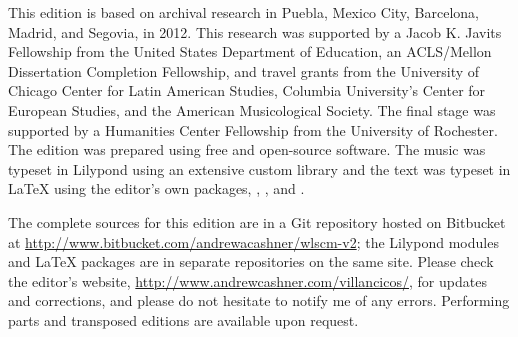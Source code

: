 This edition is based on archival research in Puebla, Mexico City, Barcelona,
Madrid, and Segovia, in 2012.
This research was supported by a Jacob K. Javits Fellowship from the United
States Department of Education, an ACLS/Mellon Dissertation Completion
Fellowship, and travel grants from the University of Chicago Center for Latin
American Studies, Columbia University's Center for European Studies, and the
American Musicological Society.
The final stage was supported by a Humanities Center Fellowship from the
University of Rochester.
The edition was prepared using free and open-source software.
The music was typeset in Lilypond using an extensive custom library and the
text was typeset in \LaTeX{} using the editor's own packages,
, ,  and
.

The complete sources for this edition are in a Git repository hosted on
Bitbucket at \url{http://www.bitbucket.com/andrewacashner/wlscm-v2}; the
Lilypond modules and LaTeX packages are in separate repositories on the same
site.
Please check the editor's website,
\url{http://www.andrewcashner.com/villancicos/}, for updates and corrections,
and please do not hesitate to notify me of any errors.
Performing parts and transposed editions are available upon request.



